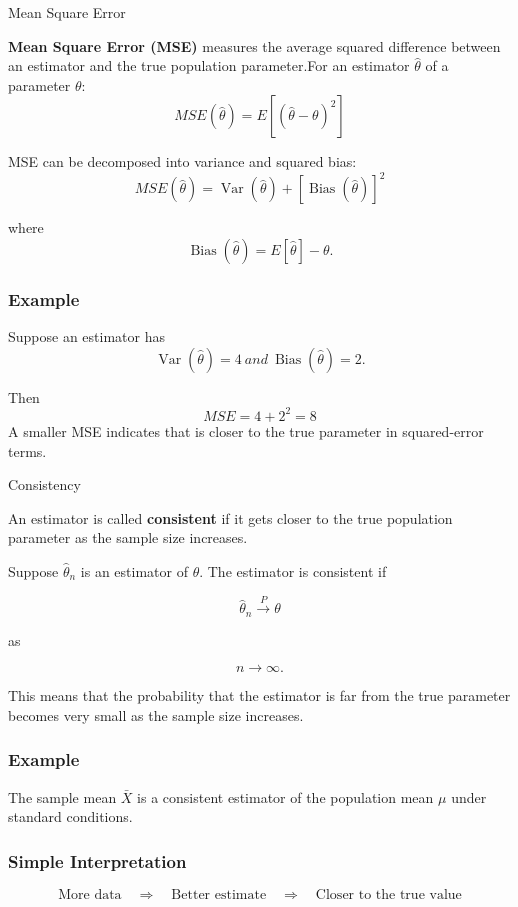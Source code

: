 \documentclass[aspectratio=169]{beamer}
\begin{document}
\begin{frame}{Mean Square Error}


\textbf{Mean Square Error (MSE)} measures the average squared difference
between an estimator and the true population parameter.For an estimator $\hat{\theta}$ of a parameter $\theta$:
\vspace{0.0 cm}
\[
\boxed{
MSE(\hat{\theta})
=
E[(\hat{\theta}-\theta)^2]
}
\]

MSE can be decomposed into variance and squared bias:
\vspace{0.0 cm}
\[
\boxed{
MSE(\hat{\theta})
=
\operatorname{Var}(\hat{\theta})
+
\left[\operatorname{Bias}(\hat{\theta})\right]^2
}
\]

where
\vspace{0.0 cm}
\[
\operatorname{Bias}(\hat{\theta})
=
E[\hat{\theta}]-\theta.
\]

\subsubsection*{Example}

Suppose an estimator has
\vspace{0.0 cm}
\[
\operatorname{Var}(\hat{\theta})=4 \:
and
\:\operatorname{Bias}(\hat{\theta})=2.
\]

Then
\vspace{0.0 cm}
\[
MSE=4+2^2 =8
\]
\vspace{0.0 cm}
A smaller MSE indicates that is closer to the true parameter in squared-error terms.
\end{frame}
\begin{frame}{Consistency}

An estimator is called \textbf{consistent} if it gets closer to the
true population parameter as the sample size increases.

Suppose $\hat{\theta}_n$ is an estimator of $\theta$. The estimator is
consistent if

\[
\boxed{
\hat{\theta}_n
\xrightarrow{P}
\theta
}
\]

as

\[
n\rightarrow\infty.
\]

This means that the probability that the estimator is far from the
true parameter becomes very small as the sample size increases.

\subsubsection*{Example}

The sample mean $\bar{X}$ is a consistent estimator of the population
mean $\mu$ under standard conditions.

\subsubsection*{Simple Interpretation}

\[
\boxed{
\text{More data}
\quad\Longrightarrow\quad
\text{Better estimate}
\quad\Longrightarrow\quad
\text{Closer to the true value}
}
\]
\end{frame}
\end{document}
